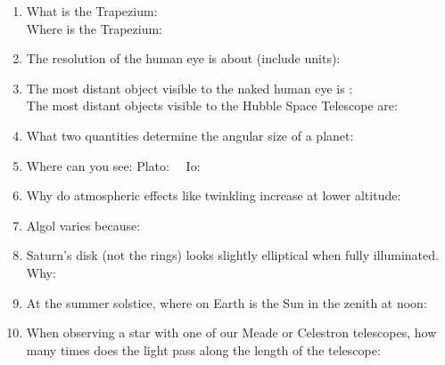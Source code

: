 \documentclass[11pt]{article}
\begin{document}
\begin{enumerate}
\vspace{0.5cm}
\item 
What is the Trapezium:  \makebox[3cm]{\hrulefill} \\
Where is the Trapezium:  \makebox[3cm]{\hrulefill}

\vspace{0.5cm}
\item 
The resolution of the human eye is about (include units): 
\makebox[3cm]{\hrulefill}  \\

\vspace{0.5cm}
\item
The most distant object visible to the naked human eye is :
\makebox[3cm]{\hrulefill} \\
The most distant objects visible to the Hubble Space Telescope are: 
\makebox[3cm]{\hrulefill}
 

\vspace{0.5cm}
\item
What two quantities determine the angular size of a planet:
\makebox[3cm]{\hrulefill} 


\vspace{0.5cm}
\item
Where can you see:  Plato: \makebox[3cm]{\hrulefill}  \ \ Io: \makebox[3cm]{\hrulefill}
  

\vspace{0.5cm}
\item
Why do atmospheric effects like twinkling increase at lower altitude: 
 \makebox[3cm]{\hrulefill} 



\vspace{0.5cm}
\item
Algol varies because: \makebox[3cm]{\hrulefill}

\vspace{0.5cm}
\item
Saturn's disk (not the rings) looks slightly elliptical when fully
illuminated. Why: \makebox[3cm]{\hrulefill}   

\vspace{0.5cm}
\item
At the summer solstice, where on Earth is the Sun in the zenith at
noon: \makebox[3cm]{\hrulefill}


\vspace{0.5cm}
\item
When observing a star with one of our Meade or Celestron telescopes, 
how many times does the light pass along the length of the telescope:
\makebox[3cm]{\hrulefill}


\end{enumerate}
\end{document}
